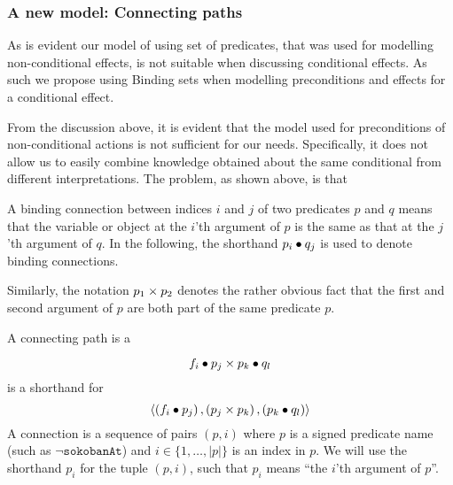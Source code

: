 \documentclass[../Master.tex]{subfiles}
\begin{document}
\subsubsection{A new model: Connecting paths}
As is evident our model of using set of predicates, that was used for modelling non-conditional effects, is not suitable when discussing conditional effects. As such we propose using Binding sets when modelling preconditions and effects for a conditional effect.

From the discussion above, it is evident that the model used for preconditions of non-conditional actions is not sufficient for our needs. Specifically, it does not allow us to easily combine knowledge obtained about the same conditional from different interpretations. The problem, as shown above, is that 

\begin{definition}\label{def:ca:varConns}
    A binding connection between indices $i$ and $j$ of two predicates $p$ and $q$ means that the variable or object at the $i$'th argument of $p$ is the same as that at the $j$'th argument of $q$. In the following, the shorthand $p_i \bullet q_j$ is used to denote binding connections.
\end{definition}

\begin{definition}
    Similarly, the notation $p_1 \times p_2$ denotes the rather obvious fact that the first and second argument of $p$ are both part of the same predicate $p$.
\end{definition}

\begin{definition}\label{def:ca:connectingPath}
    A connecting path is a 
    
    \begin{equation*}
        f_i \bullet p_j \times p_k \bullet q_l
    \end{equation*}
    is a shorthand for
    \begin{equation*}
        \left< \left( f_i \bullet p_j \right), \left( p_j \times p_k \right), \left( p_k \bullet q_l \right) \right>
    \end{equation*}
    A connection is a sequence of pairs $\left( p, i \right)$ where $p$ is a signed predicate name (such as $\neg \texttt{sokobanAt}$) and $i \in \{ 1, \dots, |p| \}$ is an index in $p$. We will use the shorthand $p_i$ for the tuple $(p,i)$, such that $p_i$ means ``the $i$'th argument of $p$''.
\end{definition}
\end{document}
